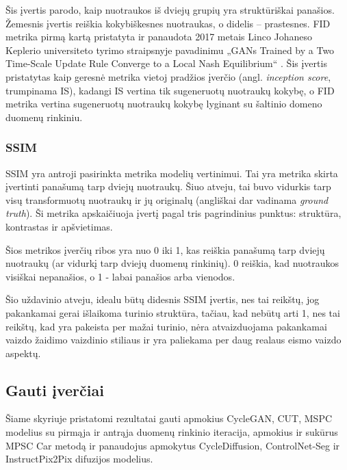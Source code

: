 \documentclass{VUMIFPSbakalaurinis}
\begin{document}
            Šis įvertis parodo, kaip nuotraukos iš dviejų grupių yra struktūriškai panašios. Žemesnis įvertis reiškia kokybiškesnes nuotraukas, o didelis – prastesnes. FID metrika pirmą kartą pristatyta ir panaudota 2017 metais Linco Johaneso Keplerio universiteto tyrimo straipsnyje pavadinimu „GANs Trained by a Two Time-Scale Update Rule Converge to a Local Nash Equilibrium“ \cite{FidStart}. Šis įvertis pristatytas kaip geresnė metrika vietoj pradžios įverčio (angl. \emph{inception score}, trumpinama IS), kadangi IS vertina tik sugeneruotų nuotraukų kokybę, o FID metrika vertina sugeneruotų nuotraukų kokybę lyginant su šaltinio domeno duomenų rinkiniu.

        \subsubsection{SSIM}
            SSIM \cite{SSIM} yra antroji pasirinkta metrika modelių vertinimui. Tai yra metrika skirta įvertinti panašumą tarp dviejų nuotraukų. Šiuo atveju, tai buvo vidurkis tarp visų transformuotų nuotraukų ir jų originalų (angliškai dar vadinama \emph{ground truth}). Ši metrika apskaičiuoja įvertį pagal tris pagrindinius punktus: struktūra, kontrastas ir apšvietimas.

            Šios metrikos įverčių ribos yra nuo 0 iki 1, kas reiškia panašumą tarp dviejų nuotraukų (ar vidurkį tarp dviejų duomenų rinkinių). 0 reiškia, kad nuotraukos visiškai nepanašios, o 1 - labai panašios arba vienodos.

            Šio uždavinio atveju, idealu būtų didesnis SSIM įvertis, nes tai reikštų, jog pakankamai gerai išlaikoma turinio struktūra, tačiau, kad nebūtų arti 1, nes tai reikštų, kad yra pakeista per mažai turinio, nėra atvaizduojama pakankamai vaizdo žaidimo vaizdinio stiliaus ir yra paliekama per daug realaus eismo vaizdo aspektų. 
        
   
    

    \subsection{Gauti įverčiai}
        Šiame skyriuje pristatomi rezultatai gauti apmokius CycleGAN, CUT, MSPC modelius su pirmąja ir antrąja duomenų rinkinio iteracija, apmokius ir sukūrus MPSC Car metodą ir panaudojus apmokytus CycleDiffusion, ControlNet-Seg ir InstructPix2Pix difuzijos modelius. 
\end{document}
